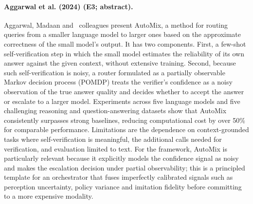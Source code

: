 \documentclass[10pt,a4paper]{article}
\begin{document}
\paragraph{Aggarwal et al. (2024) (E3; abstract).} Aggarwal, Madaan and~\cite{Aggarwal2024} colleagues present AutoMix, a method for routing queries from a smaller language model to larger ones based on the approximate correctness of the small model's output. It has two components. First, a few-shot self-verification step in which the small model estimates the reliability of its own answer against the given context, without extensive training. Second, because such self-verification is noisy, a router formulated as a partially observable Markov decision process (POMDP) treats the verifier's confidence as a noisy observation of the true answer quality and decides whether to accept the answer or escalate to a larger model. Experiments across five language models and five challenging reasoning and question-answering datasets show that AutoMix consistently surpasses strong baselines, reducing computational cost by over 50\% for comparable performance. Limitations are the dependence on context-grounded tasks where self-verification is meaningful, the additional calls needed for verification, and evaluation limited to text. For the framework, AutoMix is particularly relevant because it explicitly models the confidence signal as noisy and makes the escalation decision under partial observability; this is a principled template for an orchestrator that fuses imperfectly calibrated signals such as perception uncertainty, policy variance and imitation fidelity before committing to a more expensive modality.
\end{document}

